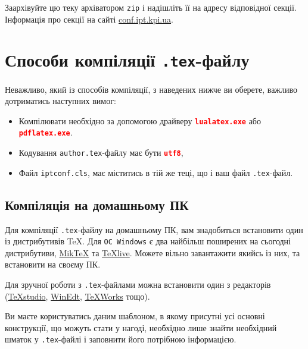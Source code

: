 \documentclass[]{iptconf}
\begin{document}
Заархівуйте цю теку архіватором \texttt{zip} і надішліть її на адресу відповідної секції. Інформація про секції на сайті \url{conf.ipt.kpi.ua}.

\section{Способи компіляції \texttt{.tex}-файлу}

Неважливо, який із способів компіляції, з наведених нижче ви оберете, важливо дотриматись наступних вимог:
\begin{tcolorbox}[breakable,enhanced,arc=0mm,colback=gray!5,colframe=red!80!black,leftrule=2mm]
	\begin{itemize}
		\item Компілювати необхідно за допомогою драйверу \textcolor{red}{\textbf{\texttt{lualatex.exe}}} або \textcolor{red}{\textbf{\texttt{pdflatex.exe}}}.
		\item Кодування \texttt{author.tex}-файлу  має бути \textcolor{red}{\textbf{\texttt{utf8}}},
		\item Файл \texttt{iptconf.cls}, має міститись в тій же теці, що і ваш файл \texttt{.tex}-файл.
	\end{itemize}
\end{tcolorbox}

\subsection{Компіляція на домашньому ПК}

Для компіляції \texttt{.tex}-файлу на домашньому ПК, вам знадобиться встановити один із дистрибутивів \TeX. Для \texttt{ОС Windows} є два найбільш
поширених на сьогодні дистрибутиви, \href{http://miktex.org/}{Mik\TeX} та \href{https://www.tug.org/texlive/}{\TeX live}. Можете вільно завантажити
якийсь із них, та встановити на своєму ПК.

Для зручної роботи з \texttt{.tex}-файлами можна встановити один з редакторів (\href{http://texstudio.sourceforge.net/}{\TeX studio},
\href{http://www.winedt.com/download.html}{WinEdt}, \href{https://www.tug.org/texworks/}{\TeX Works} тощо).

Ви маєте користуватись даним шаблоном, в якому присутні усі основні конструкції, що можуть стати у нагоді, необхідно лише знайти необхідний шматок у
\texttt{.tex}-файлі і заповнити його потрібною інформацією.
\end{document}

